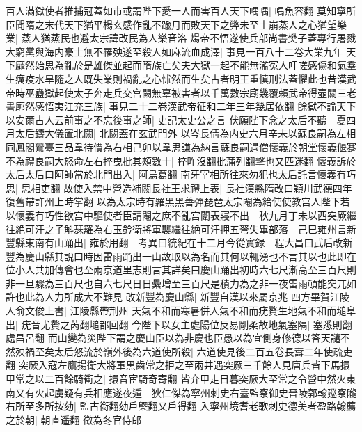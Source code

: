 百人滿獄使者推捕冠蓋如市或謂陛下愛一人而害百人天下喁喁|{
	喁魚容翻}
莫知寧所臣聞隋之末代天下猶平楊玄感作亂不踰月而敗天下之弊未至土崩蒸人之心猶望樂業|{
	蒸人猶蒸民也避太宗諱改民為人樂音洛}
煬帝不悟遂使兵部尚書樊子蓋專行屠戮大窮黨與海内豪士無不罹殃遂至殺人如麻流血成澤|{
	事見一百八十二卷大業九年}
天下靡然始思為亂於是雄傑並起而隋族亡矣夫大獄一起不能無濫寃人吁嗟感傷和氣羣生癘疫水旱隨之人既失業則禍亂之心怵然而生矣古者明王重慎刑法蓋懼此也昔漢武帝時巫蠱獄起使太子奔走兵交宫闕無辜被害者以千萬數宗廟幾覆賴武帝得壺關三老書廓然感悟夷江充三族|{
	事見二十二卷漢武帝征和二年三年幾居依翻}
餘獄不論天下以安爾古人云前事之不忘後事之師|{
	史記太史公之言}
伏願陛下念之太后不聽　夏四月太后鑄大儀置北闕|{
	北闕蓋在玄武門外}
以岑長倩為内史六月辛未以蘇良嗣為左相同鳳閣鸞臺三品韋待價為右相己卯以韋思謙為納言蘇良嗣遇僧懷義於朝堂懷義偃蹇不為禮良嗣大怒命左右捽曳批其頰數十|{
	捽昨沒翻批蒲列翻擊也又匹迷翻}
懷義訴於太后太后曰阿師當於北門出入|{
	阿烏葛翻}
南牙宰相所往來勿犯也太后託言懷義有巧思|{
	思相吏翻}
故使入禁中營造補闕長社王求禮上表|{
	長社漢縣隋改曰穎川武德四年復舊帶許州上時掌翻}
以為太宗時有羅黑黑善彈琵琶太宗閹為給使使教宫人陛下若以懷義有巧性欲宫中驅使者臣請閹之庶不亂宫闈表寢不出　秋九月丁未以西突厥繼往絶可汗之子斛瑟羅為右玉鈐衛將軍襲繼往絶可汗押五弩失畢部落　己巳雍州言新豐縣東南有山踊出|{
	雍於用翻　考異曰統紀在十二月今從實録　程大昌曰武后改新豐為慶山縣其說曰時因雷雨踊出一山故取以為名而其何以輒湧也不言其以也此即在位小人共加傳會也至兩京道里志則言其詳矣曰慶山踊出初時六七尺漸高至三百尺則非一旦驟為三百尺也自六七尺日日纍增至三百尺是積力為之非一夜雷雨頓能突兀如許也此為人力所成大不難見}
改新豐為慶山縣|{
	新豐自漢以來屬京兆}
四方畢賀江陵人俞文俊上書|{
	江陵縣帶荆州}
天氣不和而寒暑併人氣不和而疣贅生地氣不和而塠阜出|{
	疣音尤贅之芮翻塠都回翻}
今陛下以女主處陽位反易剛柔故地氣塞隔|{
	塞悉則翻處昌呂翻}
而山變為災陛下謂之慶山臣以為非慶也臣愚以為宜側身修德以答天譴不然殃禍至矣太后怒流於嶺外後為六道使所殺|{
	六道使見後二百五卷長夀二年使疏吏翻}
突厥入寇左鷹揚衛大將軍黑齒常之拒之至兩井遇突厥三千餘人見唐兵皆下馬擐甲常之以二百餘騎衝之|{
	擐音宦騎奇寄翻}
皆弃甲走日暮突厥大至常之令營中然火東南又有火起虜疑有兵相應遂夜遁　狄仁傑為寧州刺史右臺監察御史晉陵郭翰廵察隴右所至多所按劾|{
	監古銜翻劾戶槩翻又戶得翻}
入寧州境耆老歌刺史德美者盈路翰薦之於朝|{
	朝直遥翻}
徵為冬官侍郎

